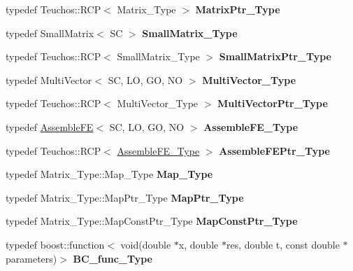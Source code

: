 \begin{DoxyCompactItemize}
\item 
\mbox{\label{classFEDD_1_1FE__Test_a3c2e34afc3a1495c2b00313399f12b3d}} 
typedef Teuchos\+::\+R\+CP$<$ Matrix\+\_\+\+Type $>$ {\bfseries Matrix\+Ptr\+\_\+\+Type}
\item 
\mbox{\label{classFEDD_1_1FE__Test_a11f3375e690a493e9076b63b0f86edf4}} 
typedef Small\+Matrix$<$ SC $>$ {\bfseries Small\+Matrix\+\_\+\+Type}
\item 
\mbox{\label{classFEDD_1_1FE__Test_a675b52d9e58407c6baadb403394be92b}} 
typedef Teuchos\+::\+R\+CP$<$ Small\+Matrix\+\_\+\+Type $>$ {\bfseries Small\+Matrix\+Ptr\+\_\+\+Type}
\item 
\mbox{\label{classFEDD_1_1FE__Test_a431ec5a97628feb8a0a8d16874ecd060}} 
typedef Multi\+Vector$<$ SC, LO, GO, NO $>$ {\bfseries Multi\+Vector\+\_\+\+Type}
\item 
\mbox{\label{classFEDD_1_1FE__Test_ac7c0363aa74e0bfcb903c13330c50185}} 
typedef Teuchos\+::\+R\+CP$<$ Multi\+Vector\+\_\+\+Type $>$ {\bfseries Multi\+Vector\+Ptr\+\_\+\+Type}
\item 
\mbox{\label{classFEDD_1_1FE__Test_afbc20c921480ce9f89ec045f94f6806a}} 
typedef \hyperlink{classFEDD_1_1AssembleFE}{Assemble\+FE}$<$ SC, LO, GO, NO $>$ {\bfseries Assemble\+F\+E\+\_\+\+Type}
\item 
\mbox{\label{classFEDD_1_1FE__Test_a7a938cd88b5f936c58993fff97074e2d}} 
typedef Teuchos\+::\+R\+CP$<$ \hyperlink{classFEDD_1_1AssembleFE}{Assemble\+F\+E\+\_\+\+Type} $>$ {\bfseries Assemble\+F\+E\+Ptr\+\_\+\+Type}
\item 
\mbox{\label{classFEDD_1_1FE__Test_a416d3abf702e778eb7fab3cd1feb3ede}} 
typedef Matrix\+\_\+\+Type\+::\+Map\+\_\+\+Type {\bfseries Map\+\_\+\+Type}
\item 
\mbox{\label{classFEDD_1_1FE__Test_af41d3f3475a5ac2e0c7d3aab1b06102b}} 
typedef Matrix\+\_\+\+Type\+::\+Map\+Ptr\+\_\+\+Type {\bfseries Map\+Ptr\+\_\+\+Type}
\item 
\mbox{\label{classFEDD_1_1FE__Test_ad09d94cdf8e7574fc9b6d1648fa18826}} 
typedef Matrix\+\_\+\+Type\+::\+Map\+Const\+Ptr\+\_\+\+Type {\bfseries Map\+Const\+Ptr\+\_\+\+Type}
\item 
\mbox{\label{classFEDD_1_1FE__Test_a1ac70a79e5935320b05ecf16739ad8a4}} 
typedef boost\+::function$<$ void(double $\ast$x, double $\ast$res, double t, const double $\ast$parameters)$>$ {\bfseries B\+C\+\_\+func\+\_\+\+Type}
\end{DoxyCompactItemize}
